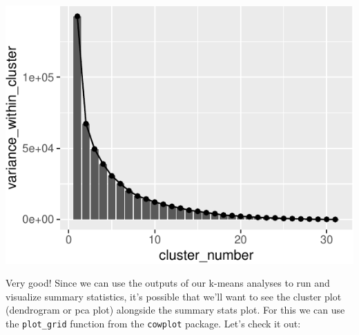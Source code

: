 \documentclass[
]{krantz}
\begin{document}
\begin{center}\includegraphics[width=0.8\linewidth]{index_files/figure-latex/unnamed-chunk-109-1} \end{center}

Very good! Since we can use the outputs of our k-means analyses to run and visualize summary statistics, it's possible that we'll want to see the cluster plot (dendrogram or pca plot) alongside the summary stats plot. For this we can use the \texttt{plot\_grid} function from the \texttt{cowplot} package. Let's check it out:
\end{document}
